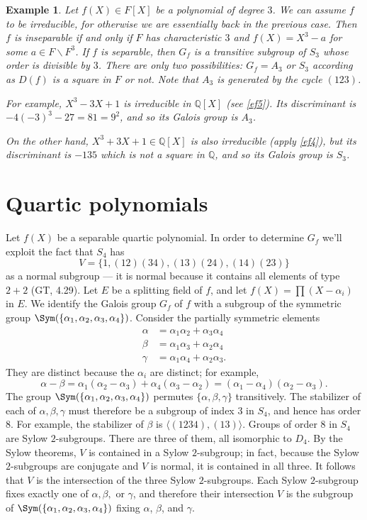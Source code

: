 \documentclass[a4paper,11pt,final,openany]{memoir}
\newtheorem{example}[X]{Example}
\theoremstyle{nonumberplain}
\begin{document}
\begin{example}
\label{cg6}Let $f(X)\in F[X]$ be a polynomial of degree $3$. We can assume $f$
to be irreducible, for otherwise we are essentially back in the previous case.
Then $f$ is inseparable if and only if $F$ has characteristic $3$ and
$f(X)=X^{3}-a$ for some $a\in F\smallsetminus F^{3}$. If $f$ is separable,
then $G_{f}$ is a transitive subgroup of $S_{3}$ whose order is divisible by
$3$. There are only two possibilities: $G_{f}=A_{3}$ or $S_{3}$ according as
$D(f)$ is a square in $F$ or not. Note that $A_{3}$ is generated by the cycle
$(123)$.

For example, $X^{3}-3X+1$ is irreducible in $\mathbb{Q}{}[X]$ (see \ref{ef5}).
Its discriminant is $-4(-3)^{3}-27=81=9^{2}$, and so its Galois group is
$A_{3}$.

On the other hand, $X^{3}+3X+1\in\mathbb{Q}[X]$ is also irreducible (apply
\ref{ef4}), but its discriminant is $-135$ which is not a square in
$\mathbb{Q}$, and so its Galois group is $S_{3}$.
\end{example}

\section{Quartic polynomials}

Let $f(X)$ be a separable quartic polynomial. In order to determine $G_{f}$
we'll exploit the fact that $S_{4}$ has
\[
V=\{1,(12)(34),(13)(24),(14)(23)\}
\]
as a normal subgroup --- it is normal because it contains all elements of type
$2+2$ (GT, 4.29). Let $E$ be a splitting field of $f$, and let
$f(X)=\prod(X-\alpha_{i})$ in $E$. We identify the Galois group $G_{f}$ of $f$
with a subgroup of the symmetric group $\Sym(\{\alpha_{1},\alpha_{2}%
,\alpha_{3},\alpha_{4}\})$. Consider the partially symmetric elements
\begin{align*}
\alpha &  =\alpha_{1}\alpha_{2}+\alpha_{3}\alpha_{4}\\
\beta &  =\alpha_{1}\alpha_{3}+\alpha_{2}\alpha_{4}\\
\gamma &  =\alpha_{1}\alpha_{4}+\alpha_{2}\alpha_{3}.
\end{align*}
They are distinct because the $\alpha_{i}$ are distinct; for example,
\[
\alpha-\beta=\alpha_{1}(\alpha_{2}-\alpha_{3})+\alpha_{4}(\alpha_{3}%
-\alpha_{2})=(\alpha_{1}-\alpha_{4})(\alpha_{2}-\alpha_{3}).
\]
The group $\Sym(\{\alpha_{1},\alpha_{2},\alpha_{3},\alpha_{4}\})$ permutes
$\{\alpha,\beta,\gamma\}$ transitively. The stabilizer of each of
$\alpha,\beta,\gamma$ must therefore be a subgroup of index $3$ in $S_{4}$,
and hence has order $8$. For example, the stabilizer of $\beta$ is $\langle
{}(1234),(13)\rangle$. Groups of order $8$ in $S_{4}$ are Sylow $2$-subgroups.
There are three of them, all isomorphic to $D_{4}$. By the Sylow theorems, $V$
is contained in a Sylow $2$-subgroup; in fact, because the Sylow $2$-subgroups
are conjugate and $V$ is normal, it is contained in all three. It follows that
$V$ is the intersection of the three Sylow $2$-subgroups. Each Sylow
$2$-subgroup fixes exactly one of $\alpha,\beta,$ or $\gamma$, and therefore
their intersection $V$ is the subgroup of $\Sym(\{\alpha_{1},\alpha_{2}%
,\alpha_{3},\alpha_{4}\})$ fixing $\alpha$, $\beta$, and $\gamma$.\bigskip
\end{document}
